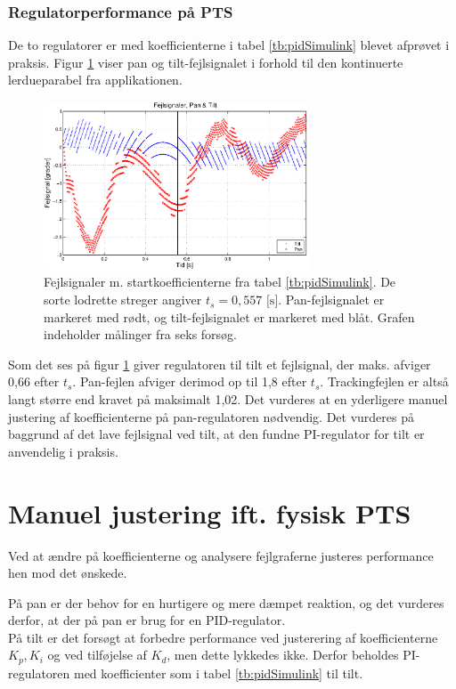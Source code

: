 \subsubsection{Regulatorperformance på PTS}
De to regulatorer er med koefficienterne i tabel \ref{tb:pidSimulink} blevet afprøvet i praksis.
Figur \ref{fig:pidPhys1} viser pan og tilt-fejlsignalet i forhold til den kontinuerte lerdueparabel fra applikationen.

\begin{figure}[h!]
\centering
\includegraphics[width=0.7\textwidth]{./graphics/pidPhys1.eps}
\captionsetup{width=0.6\textwidth}
\caption[Fejlsignaler m. startkoefficienter]{Fejlsignaler m. startkoefficienterne fra tabel \ref{tb:pidSimulink}.
	De sorte lodrette streger angiver \(t_s=0,557 \text{ [s]}\).
	Pan-fejlsignalet er markeret med rødt, og tilt-fejlsignalet er markeret med blåt.
	Grafen indeholder målinger fra seks forsøg.} 
\label{fig:pidPhys1}
\end{figure}

Som det ses på figur \ref{fig:pidPhys1} giver regulatoren til tilt et fejlsignal,
der maks. afviger 0,66\degree{} efter \(t_s\).
Pan-fejlen afviger derimod op til 1,8\degree{} efter \(t_s\).
Trackingfejlen er altså langt større end kravet på maksimalt 1,02\degree.
Det vurderes at en yderligere manuel justering af koefficienterne på pan-regulatoren nødvendig.
Det vurderes på baggrund af det lave fejlsignal ved tilt, at den fundne
PI-regulator for tilt er anvendelig i praksis.


\section{Manuel justering ift. fysisk PTS}
Ved at ændre på koefficienterne og analysere fejlgraferne justeres performance 
hen mod det ønskede.

På pan er der behov for en hurtigere og mere dæmpet reaktion,
og det vurderes derfor, at der på pan er brug for en PID-regulator.
\\
På tilt er det forsøgt at forbedre performance ved justerering af koefficienterne $K_p,K_i$ 
og ved tilføjelse af $K_d$, men dette lykkedes ikke. Derfor beholdes 
PI-regulatoren med koefficienter som i tabel \ref{tb:pidSimulink} til tilt.

